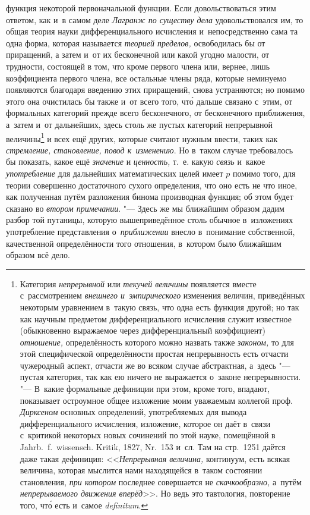 функция некоторой первоначальной функции. Если довольствоваться этим ответом,
как и~в самом деле {\em Лагранж по существу дела} удовольствовался им, то общая
теория науки дифференциального исчисления и~непосредственно сама та одна форма,
которая называется {\em теорией пределов,} освободилась бы от приращений, а
затем и~от их бесконечной или какой угодно малости, от трудности, состоящей в
том, что кроме первого члена или, вернее, лишь коэффициента первого члена, все
остальные члены ряда, которые неминуемо появляются благодаря введению этих
приращений, снова устраняются; но помимо этого она очистилась бы также и~от
всего того, чт\'{о} дальше связано с~этим, от формальных категорий прежде всего
бесконечного, от бесконечного приближения, а~затем и~от дальнейших, здесь столь же
пустых категорий непрерывной величины\footnote{Категория {\em непрерывной} или
{\em текучей величины} появляется вместе с~рассмотрением
{\em внешнего и~эмпирического} изменения величин, приведённых некоторым
уравнением в~такую связь, что одна есть функция другой; но так как научным
предметом дифференциального исчисления служит известное (обыкновенно выражаемое
через дифференциальный коэффициент) {\em отношение,} определённость которого
можно назвать также {\em законом,} то для этой специфической
определённости простая непрерывность есть отчасти чужеродный аспект, отчасти же
во всяком случае абстрактная, а~здесь "--- пустая категория, так как ею ничего
не выражается о~законе непрерывности. "--- В~какие формальные дефиниции при
этом, кроме того, впадают, показывает остроумное общее изложение моим уважаемым
коллегой проф. {\em Дирксеном} основных определений, употребляемых для вывода
дифференциального исчисления, изложение, которое он даёт в~связи с~критикой
некоторых новых сочинений по этой науке, помещённой в Jahrb.~f.~wis\-sen\-sch.
Kri\-tik, 1827, Nr.~153 и~сл. Там на стр.~1251 даётся даже такая дефиниция:
<<{\em Непрерывная величина,} континуум, есть всякая величина, которая мыслится нами
находящейся в~таком состоянии становления, {\em при котором} последнее совершается не
{\em скачкообразно,} а~путём {\em непрерываемого движения вперёд}>>. Но ведь
это тавтология, повторение того, чт\'{о} есть и~самое {\em de\-fi\-ni\-tum}.} и
всех ещё других, которые считают нужным ввести, таких как
{\em стремление, становление, повод к~изменению}. Но в~таком случае требовалось
бы показать, какое ещё {\em значение} и {\em ценность,} т.~е. какую {\em связь}
и~какое {\em употребление} для дальнейших математических целей имеет $p$ помимо
того, для теории совершенно достаточного сухого определения, что оно есть
не что иное, как полученная путём разложения бинома производная функция; об этом
будет сказано во {\em втором примечании}. "--- Здесь же мы ближайшим образом
дадим разбор той путаницы, которую вышеприведённое столь обычное в~изложениях
употребление представления о~{\em приближении} внесло в~понимание собственной,
качественной определённости того отношения, в~котором было ближайшим образом
всё дело.

